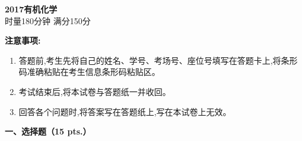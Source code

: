 \begin{center}
    {\LARGE \textbf{2017有机化学}} \\[2ex]
    {\large 时量180分钟 \quad 满分150分}
\end{center}

\vspace{0.5cm}
\noindent\textbf{注意事项:}
\begin{enumerate}[label=\arabic*., parsep=0pt, itemsep=0pt]
    \item 答题前,考生先将自己的姓名、学号、考场号、座位号填写在答题卡上,将条形码准确粘贴在考生信息条形码粘贴区。
    \item 考试结束后,将本试卷与答题纸一并收回。
    \item 回答各个问题时,将答案写在答题纸上,写在本试卷上无效。
\end{enumerate}

\vspace{0.5cm}
\noindent\textbf{一、选择题（15 pts.）}

